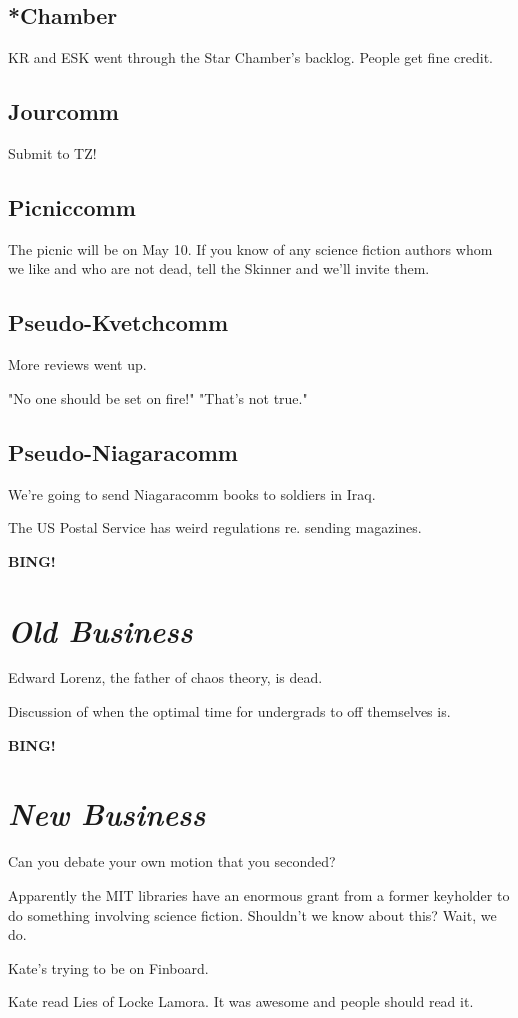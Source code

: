 \documentclass[10pt]{article}
\newcommand{\bing}{{\bf BING!} }
\newcommand{\goto}[1]{\bing \vskip 12pt \section*{{\em{#1}}}}
\begin{document}
\subsection*{*Chamber}

KR and ESK went through the Star Chamber's backlog. People get fine 
credit.

\subsection*{Jourcomm}

Submit to TZ!

\subsection*{Picniccomm}

The picnic will be on May 10. If you know of any science fiction authors 
whom we like and who are not dead, tell the Skinner and we'll invite them.

\subsection*{Pseudo-Kvetchcomm}

More reviews went up.

"No one should be set on fire!" "That's not true."

\subsection*{Pseudo-Niagaracomm}

We're going to send Niagaracomm books to soldiers in Iraq.

The US Postal Service has weird regulations re. sending magazines.

\goto{Old Business}

Edward Lorenz, the father of chaos theory, is dead.

Discussion of when the optimal time for undergrads to off themselves is.

\goto{New Business}

Can you debate your own motion that you seconded?

Apparently the MIT libraries have an enormous grant from a former 
keyholder to do something involving science fiction. Shouldn't we know 
about this? Wait, we do.

Kate's trying to be on Finboard. 

Kate read Lies of Locke Lamora. It was awesome and people should read it.
\end{document}
